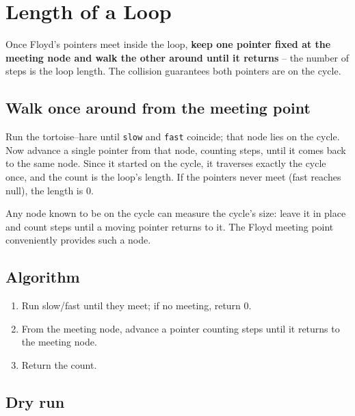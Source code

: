 \section{Length of a Loop}
\label{sec:ll-loop-length}


\begin{patternbox}
Once Floyd's pointers meet inside the loop, \textbf{keep one pointer fixed
at the meeting node and walk the other around until it returns} -- the
number of steps is the loop length. The collision guarantees both pointers
are on the cycle.
\end{patternbox}

\subsection*{Walk once around from the meeting point}

Run the tortoise--hare until \texttt{slow} and \texttt{fast} coincide; that
node lies on the cycle. Now advance a single pointer from that node,
counting steps, until it comes back to the same node. Since it started on
the cycle, it traverses exactly the cycle once, and the count is the loop's
length. If the pointers never meet (fast reaches null), the length is $0$.

\begin{ideabox}
Any node known to be on the cycle can measure the cycle's size: leave it in
place and count steps until a moving pointer returns to it. The Floyd
meeting point conveniently provides such a node.
\end{ideabox}

\subsection*{Algorithm}

\begin{enumerate}
  \item Run slow/fast until they meet; if no meeting, return $0$.
  \item From the meeting node, advance a pointer counting steps until it
        returns to the meeting node.
  \item Return the count.
\end{enumerate}

\subsection*{Dry run}

